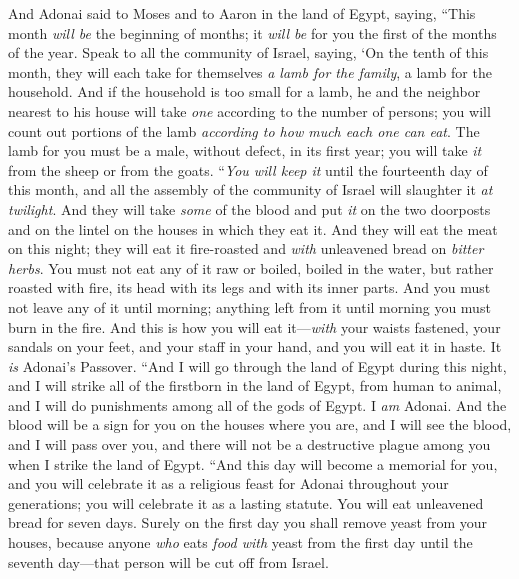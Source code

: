 \begin{biblechapter} %
 And Adonai said to Moses and to Aaron in the land of Egypt, saying,
\verse “This month \textit{will be} the beginning of months; it \textit{will be} for you the first of the months of the year.
\verse Speak to all the community of Israel, saying, ‘On the tenth of this month, they will each take for themselves \textit{a lamb for the family}, a lamb for the household.
\verse And if the household is too small for a lamb, he and the neighbor nearest to his house will take \textit{one} according to the number of persons; you will count out portions of the lamb \textit{according to how much each one can eat}.
\verse The lamb for you must be a male, without defect, in its first year; you will take \textit{it} from the sheep or from the goats.
\verse “\textit{You will keep it} until the fourteenth day of this month, and all the assembly of the community of Israel will slaughter it \textit{at twilight}.
\verse And they will take \textit{some} of the blood and put \textit{it} on the two doorposts and on the lintel on the houses in which they eat it.
\verse And they will eat the meat on this night; they will eat it fire-roasted and \textit{with} unleavened bread on \textit{bitter herbs}.
\verse You must not eat any of it raw or boiled, boiled in the water, but rather roasted with fire, its head with its legs and with its inner parts.
\verse And you must not leave any of it until morning; anything left from it until morning you must burn in the fire.
\verse And this is how you will eat it—\textit{with} your waists fastened, your sandals on your feet, and your staff in your hand, and you will eat it in haste. It \textit{is} Adonai’s Passover.
\verse “And I will go through the land of Egypt during this night, and I will strike all of the firstborn in the land of Egypt, from human to animal, and I will do punishments among all of the gods of Egypt. I \textit{am} Adonai.
\verse And the blood will be a sign for you on the houses where you are, and I will see the blood, and I will pass over you, and there will not be a destructive plague among you when I strike the land of Egypt.
\verse “And this day will become a memorial for you, and you will celebrate it as a religious feast for Adonai throughout your generations; you will celebrate it as a lasting statute.
\verse You will eat unleavened bread for seven days. Surely on the first day you shall remove yeast from your houses, because anyone \textit{who} eats \textit{food with} yeast from the first day until the seventh day—that person will be cut off from Israel.

\end{biblechapter}
